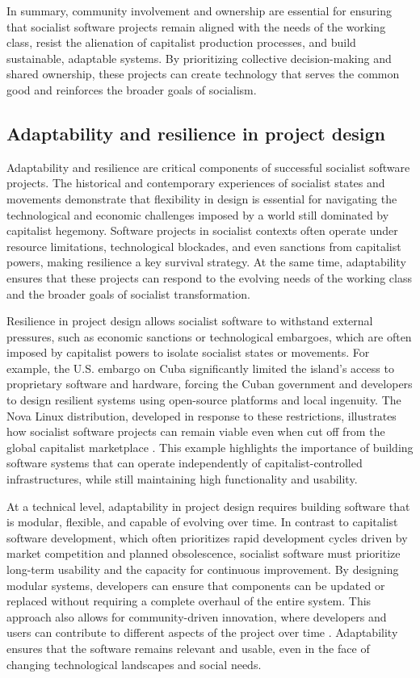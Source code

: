 \begin{refsection}
In summary, community involvement and ownership are essential for ensuring that socialist software projects remain aligned with the needs of the working class, resist the alienation of capitalist production processes, and build sustainable, adaptable systems. By prioritizing collective decision-making and shared ownership, these projects can create technology that serves the common good and reinforces the broader goals of socialism.

\subsection{Adaptability and resilience in project design}

Adaptability and resilience are critical components of successful socialist software projects. The historical and contemporary experiences of socialist states and movements demonstrate that flexibility in design is essential for navigating the technological and economic challenges imposed by a world still dominated by capitalist hegemony. Software projects in socialist contexts often operate under resource limitations, technological blockades, and even sanctions from capitalist powers, making resilience a key survival strategy. At the same time, adaptability ensures that these projects can respond to the evolving needs of the working class and the broader goals of socialist transformation.

Resilience in project design allows socialist software to withstand external pressures, such as economic sanctions or technological embargoes, which are often imposed by capitalist powers to isolate socialist states or movements. For example, the U.S. embargo on Cuba significantly limited the island’s access to proprietary software and hardware, forcing the Cuban government and developers to design resilient systems using open-source platforms and local ingenuity. The Nova Linux distribution, developed in response to these restrictions, illustrates how socialist software projects can remain viable even when cut off from the global capitalist marketplace \cite[pp.~79-82]{ernesto1968}. This example highlights the importance of building software systems that can operate independently of capitalist-controlled infrastructures, while still maintaining high functionality and usability.

At a technical level, adaptability in project design requires building software that is modular, flexible, and capable of evolving over time. In contrast to capitalist software development, which often prioritizes rapid development cycles driven by market competition and planned obsolescence, socialist software must prioritize long-term usability and the capacity for continuous improvement. By designing modular systems, developers can ensure that components can be updated or replaced without requiring a complete overhaul of the entire system. This approach also allows for community-driven innovation, where developers and users can contribute to different aspects of the project over time \cite[pp.~123-126]{raymond2022}. Adaptability ensures that the software remains relevant and usable, even in the face of changing technological landscapes and social needs.


\end{refsection}

